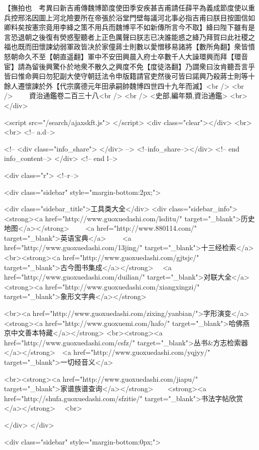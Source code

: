 【撫拍也　考異曰新吉甫傳魏博節度使田季安疾甚吉甫請任薛平為義成節度使以重兵控邢洺因圖上河北險要所在帝張於浴堂門壁每議河北事必指吉甫曰朕目按圖信如卿料矣按憲宗竟用李絳之策不用兵而魏博平不如新傳所言今不取】絳曰陛下雖有是言恐退朝之後復有熒惑聖聽者上正色厲聲曰朕志已决誰能惑之絳乃拜賀曰此社稷之福也既而田懷諫幼弱軍政皆决於家僮蔣士則數以愛憎移易諸將【數所角翻】衆皆憤怒朝命久不至【朝直遥翻】軍中不安田興晨入府士卒數千人大譟環興而拜【環音宦】請為留後興驚仆於地衆不散久之興度不免【度徒洛翻】乃謂衆曰汝肯聽吾言乎皆曰惟命興曰勿犯副大使守朝廷法令申版籍請官吏然後可皆曰諾興乃殺蔣士則等十餘人遷懷諫於外【代宗廣德元年田承嗣帥魏博四世四十九年而滅】<br />
<br />
　　資治通鑑卷二百三十八<br />
<br />
<史部,編年類,資治通鑑>  <br>
   </div> 

<script src="/search/ajaxskft.js"> </script>
 <div class="clear"></div>
<br>
<br>
 <!-- a.d-->

 <!--
<div class="info_share">
</div> 
-->
 <!--info_share--></div>   <!-- end info_content-->
  </div> <!-- end l-->

<div class="r">   <!--r-->



<div class="sidebar"  style="margin-bottom:2px;">

 
<div class="sidebar_title">工具类大全</div>
<div class="sidebar_info">
<strong><a href="http://www.guoxuedashi.com/lsditu/" target="_blank">历史地图</a></strong>　　
<a href="http://www.880114.com/" target="_blank">英语宝典</a>　　
<a href="http://www.guoxuedashi.com/13jing/" target="_blank">十三经检索</a>　
<br><strong><a href="http://www.guoxuedashi.com/gjtsjc/" target="_blank">古今图书集成</a></strong>　
<a href="http://www.guoxuedashi.com/duilian/" target="_blank">对联大全</a>　<strong><a href="http://www.guoxuedashi.com/xiangxingzi/" target="_blank">象形文字典</a></strong>　

<br><a href="http://www.guoxuedashi.com/zixing/yanbian/">字形演变</a>　　<strong><a href="http://www.guoxuemi.com/hafo/" target="_blank">哈佛燕京中文善本特藏</a></strong>
<br><strong><a href="http://www.guoxuedashi.com/csfz/" target="_blank">丛书&方志检索器</a></strong>　<a href="http://www.guoxuedashi.com/yqjyy/" target="_blank">一切经音义</a>　　

<br><strong><a href="http://www.guoxuedashi.com/jiapu/" target="_blank">家谱族谱查询</a></strong>　　<strong><a href="http://shufa.guoxuedashi.com/sfzitie/" target="_blank">书法字帖欣赏</a></strong>　
<br>

</div>
</div>


<div class="sidebar" style="margin-bottom:0px;">


